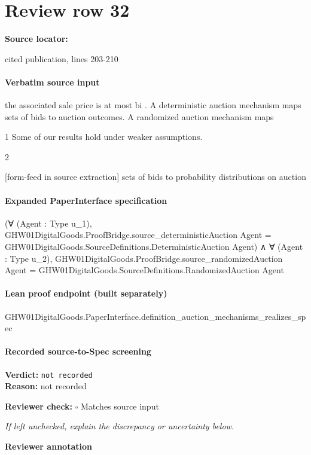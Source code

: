 \documentclass[10pt]{article}
\newcommand{\reviewerbox}{%
  \par\noindent\fbox{\parbox{0.96\linewidth}{\rule{0pt}{0.38in}}}\par
}
\newcommand{\reviewmatch}[1]{%
  \par\noindent\textbf{Reviewer check:} $\square$\; #1\par
  \noindent\emph{If left unchecked, explain the discrepancy or uncertainty below.}\par
}
\begin{document}
\section*{Review row 32}
\textbf{Source locator:} {\footnotesize\raggedright cited publication, lines 203-\allowbreak{}210\par}
\paragraph{Verbatim source input}
\begin{ReviewVerbatim}
the associated sale price is at most bi . A deterministic auction mechanism maps sets of bids to auction
outcomes. A randomized auction mechanism maps

1 Some of our results hold under weaker assumptions.

2


[form-feed in source extraction]
sets of bids to probability distributions on auction
\end{ReviewVerbatim}


\paragraph{Expanded PaperInterface specification}
\begin{ReviewVerbatim}
(∀ (Agent : Type u_1),
    GHW01DigitalGoods.ProofBridge.source_deterministicAuction Agent =
      GHW01DigitalGoods.SourceDefinitions.DeterministicAuction Agent) ∧
  ∀ (Agent : Type u_2),
    GHW01DigitalGoods.ProofBridge.source_randomizedAuction Agent =
      GHW01DigitalGoods.SourceDefinitions.RandomizedAuction Agent
\end{ReviewVerbatim}

\paragraph{Lean proof endpoint (built separately)}\begin{ReviewVerbatim}
GHW01DigitalGoods.PaperInterface.definition_auction_mechanisms_realizes_spec
\end{ReviewVerbatim}

\paragraph{Recorded source-to-Spec screening}
\textbf{Verdict:} \texttt{not recorded}
\\
\textbf{Reason:} not recorded
\reviewmatch{Matches source input}
\noindent\textbf{Reviewer annotation}\par
\reviewerbox
\clearpage
\hypertarget{source-claim-437a3f337df1e177}{}
\end{document}
